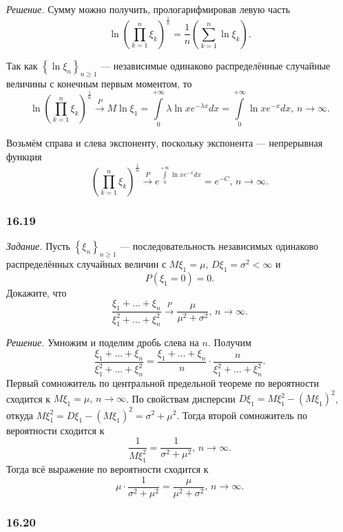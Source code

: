 \textit{Решение.} Сумму можно получить, прологарифмировав левую часть
$$ \ln \left( \prod \limits_{k = 1}^n \xi_k \right)^{ \frac{1}{n}} =
  \frac{1}{n} \left( \sum \limits_{k = 1}^n \ln \xi_k \right).$$

Так как $ \left\{ \ln \xi_n \right\}_{n \geq 1}$ ---
независимые одинаково распределённые случайные величины с конечным первым моментом, то
$$ \ln \left( \prod \limits_{k = 1}^n \xi_k \right)^{ \frac{1}{n}} \overset{P}{ \rightarrow }
  M \ln \xi_1 =
  \int \limits_0^{+ \infty } \lambda \ln x e^{- \lambda x} dx =
  \int \limits_0^{+ \infty } \ln x e^{- x} dx, \,
  n \to \infty.$$

Возьмём справа и слева экспоненту, поскольку экспонента --- непрерывная функция
$$ \left( \prod \limits_{k = 1}^n \xi_k \right)^{ \frac{1}{n}} \overset{P}{ \rightarrow }
  e^{ \int \limits_0^{+ \infty } \ln x e^{-x} dx} =
  e^{-C}, \,
  n \to \infty.$$

\subsubsection*{16.19}

\textit{Задание.}
Пусть $ \left\{ \xi_n \right\}_{n \geq 1}$ ---
последовательность независимых одинаково распределённых случайных величин с
$M \xi_1 = \mu, \, D \xi_1 = \sigma^2 < \infty $ и
$$P \left( \xi_1 = 0 \right) =
  0.$$
Докажите, что
$$ \frac{ \xi_1 + \dotsc + \xi_n}{ \xi_1^2 + \dotsc + \xi_n^2} \overset{P}{ \rightarrow }
  \frac{ \mu }{ \mu^2 + \sigma^2}, \,
  n \to \infty.$$

\textit{Решение.} Умножим и поделим дробь слева на $n$.
Получим
$$ \frac{ \xi_1 + \dotsc + \xi_n}{ \xi_1^2 + \dotsc + \xi_n^2} =
  \frac{ \xi_1 + \dotsc + \xi_n}{n} \cdot \frac{n}{ \xi_1^2 + \dotsc + \xi_n^2}.$$
Первый сомножитель по центральной предельной теореме по вероятности сходится к
$M \xi_1 = \mu, \,
  n \to \infty $.
По свойствам дисперсии $D \xi_1 = M \xi_1^2 - \left( M \xi_1 \right)^2$,
откуда $M \xi_1^2 = D \xi_1 - \left( M \xi_1 \right)^2 = \sigma^2 + \mu^2$.
Тогда второй сомножитель по вероятности сходится к
$$ \frac{1}{M \xi_1^2} =
  \frac{1}{ \sigma^2 + \mu^2}, \,
  n \to \infty.$$
Тогда всё выражение по вероятности сходится к
$$ \mu \cdot \frac{1}{ \sigma^2 + \mu^2} =
  \frac{ \mu }{ \mu^2 + \sigma^2}, \,
  n \to \infty.$$

\subsubsection*{16.20}

